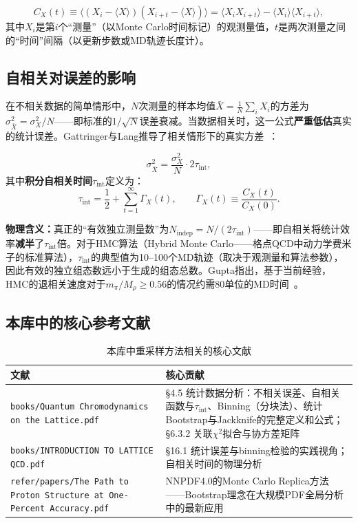 \documentclass[12pt,a4paper]{ctexart}
\theoremstyle{definition}
\begin{document}
\begin{equation}
C_X(t) \equiv \langle (X_i - \langle X\rangle)(X_{i+t} - \langle X\rangle) \rangle = \langle X_i X_{i+t} \rangle - \langle X_i\rangle\langle X_{i+t}\rangle,
\label{eq:autocorr_func}
\end{equation}
其中$X_i$是第$i$个``测量''（以Monte Carlo时间标记）的观测量值，$t$是两次测量之间的``时间''间隔（以更新步数或MD轨迹长度计）。

\subsection{自相关对误差的影响}

在不相关数据的简单情形中，$N$次测量的样本均值$\bar X = \frac{1}{N}\sum_i X_i$的方差为$\sigma^2_{\bar X} = \sigma_X^2 / N$——即标准的$1/\sqrt{N}$误差衰减。当数据相关时，这一公式\textbf{严重低估}真实的统计误差。Gattringer与Lang推导了相关情形下的真实方差~\cite{GattringerLang2010}：

\begin{equation}
\boxed{\sigma^2_{\bar X} = \frac{\sigma_X^2}{N} \cdot 2\tau_{\text{int}}},
\label{eq:correlated_variance}
\end{equation}
其中\textbf{积分自相关时间}$\tau_{\text{int}}$定义为：
\begin{equation}
\tau_{\text{int}} = \frac{1}{2} + \sum_{t=1}^\infty \Gamma_X(t), \qquad \Gamma_X(t) \equiv \frac{C_X(t)}{C_X(0)}.
\label{eq:tau_int}
\end{equation}

\textbf{物理含义：}真正的``有效独立测量数''为$N_{\text{indep}} = N/(2\tau_{\text{int}})$——即自相关将统计效率\textbf{减半}了$\tau_{\text{int}}$倍。对于HMC算法（Hybrid Monte Carlo——格点QCD中动力学费米子的标准算法），$\tau_{\text{int}}$的典型值为10--100个MD轨迹（取决于观测量和算法参数），因此有效的独立组态数远小于生成的组态总数。Gupta指出，基于当前经验，HMC的退相关速度对于$m_\pi/M_\rho \ge 0.56$的情况约需80单位的MD时间~\cite{Gupta1997intro}。

\subsection{本库中的核心参考文献}

\begin{table}[H]
\centering
\caption{本库中重采样方法相关的核心文献}
\label{tab:rs_papers}
\small
\begin{tabular}{lp{9cm}}
\toprule
文献 & 核心贡献 \\
\midrule
\texttt{books/Quantum Chromodynamics on the Lattice.pdf} & §4.5 统计数据分析：不相关误差、自相关函数与$\tau_{\text{int}}$、Binning（分块法）、统计Bootstrap与Jackknife的完整定义和公式；§6.3.2 关联$\chi^2$拟合与协方差矩阵 \\
\texttt{books/INTRODUCTION TO LATTICE QCD.pdf} & §16.1 统计误差与binning检验的实践视角；自相关时间的物理分析 \\
\texttt{refer/papers/The Path to Proton Structure at One-Percent Accuracy.pdf} &
NNPDF4.0的Monte Carlo Replica方法——Bootstrap理念在大规模PDF全局分析中的最新应用 \\
\bottomrule
\end{tabular}
\end{table}
\end{document}
